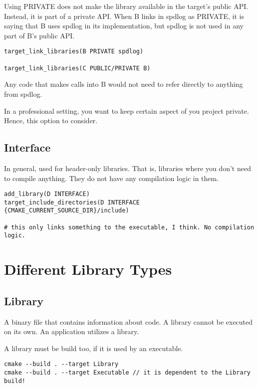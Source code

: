 \documentclass[openany]{report}
\begin{document}
Using PRIVATE does not make the library available in the target's public API. Instead, it is part of a private API.
When B links in spdlog as PRIVATE, it is saying that B uses spdlog in its implementation,
but spdlog is not used in any part of B's public API. 

\begin{verbatim}
target_link_libraries(B PRIVATE spdlog)

target_link_libraries(C PUBLIC/PRIVATE B)
\end{verbatim}

Any code that makes calls into B would not need to refer directly to anything from
spdlog.


In a professional setting, you want to keep certain aspect of you project private. Hence, this option to consider.

\subsection{Interface}

In general, used for header-only libraries. That is, libraries where you don't need to compile anything. They do not have
any compilation logic in them.

\begin{verbatim}
add_library(D INTERFACE)
target_include_directories(D INTERFACE {CMAKE_CURRENT_SOURCE_DIR}/include)

# this only links something to the executable, I think. No compilation logic.
\end{verbatim}



\section{Different Library Types}

\subsection{Library}

A binary file that contains information about code.
A library cannot be executed on its own.
An application utilizes a library.

A library must be build too, if it is used by an executable.

\begin{verbatim}
cmake --build . --target Library
cmake --build . --target Executable // it is dependent to the Library build!
\end{verbatim}
\end{document}
